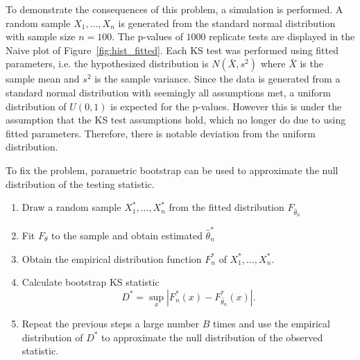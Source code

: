 \documentclass[12pt, letterpaper, titlepage]{article}
\begin{document}
To demonstrate the consequences of this problem, a simulation is performed. A 
random sample $X_1, \ldots, X_n$ is generated from the standard normal 
distribution with sample size $n = 100$. The p-values of $1000$ replicate tests 
are displayed in the Naive plot of Figure~\ref{fig:hist_fitted}. Each KS test 
was performed using fitted parameters, i.e. the hypothesized distribution is 
$N(\bar X, s^2)$ where $\bar X$ is the sample mean and $s^2$ is the sample 
variance. Since the data is generated from a standard normal distribution with 
seemingly all assumptions met, a uniform distribution of $U(0, 1)$ is expected 
for the p-values. However this is under the assumption that the KS test
assumptions hold, which no longer do due to using fitted parameters. Therefore, 
there is notable deviation from the uniform distribution. 


To fix the problem, parametric bootstrap can be used to approximate the null
distribution of the testing statistic. 
\begin{enumerate}
  \item 
    Draw a random sample $X_1^*,...,X_n^*$ from the fitted distribution 
    $F_{\hat\theta_n}$
  \item 
    Fit $F_\theta$ to the sample and obtain estimated $\hat\theta_n^*$
  \item
    Obtain the empirical distribution function $F_n^*$ of $X_1^*, \ldots, 
    X_n^*$.
  \item 
    Calculate bootstrap KS statistic
    \[
      D^* = \sup_x | F_n^* (x)- F_{\hat\theta_n}^*(x) |.
    \]
  \item
    Repeat the previous steps a large number $B$ times and use the empirical 
    distribution of $D^*$ to approximate the null distribution of the observed 
    statistic.    
\end{enumerate}
\end{document}
